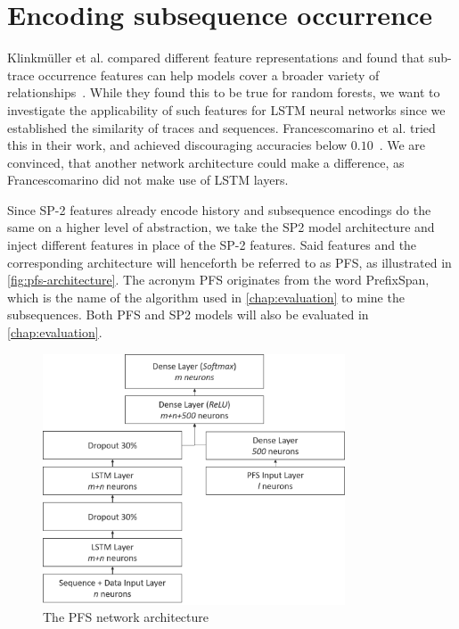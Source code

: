 \section{Encoding subsequence occurrence}
\label{sec:contrib:pfs-inspiration}
Klinkmüller et al. compared different feature representations and found that sub-trace occurrence features can help models cover a broader variety of relationships~\cite{klinkmuller2018reliablemonitoring}. While they found this to be true for random forests, we want to investigate the applicability of such features for LSTM neural networks since we established the similarity of traces and sequences. Francescomarino et al. tried this in their work, and achieved discouraging accuracies below $0.10$~\cite{francescomarino2017}. We are convinced, that another network architecture could make a difference, as Francescomarino did not make use of LSTM layers.

Since SP-2 features already encode history and subsequence encodings do the same on a higher level of abstraction, we take the SP2 model architecture and inject different features in place of the SP-2 features. Said features and the corresponding architecture will henceforth be referred to as PFS, as illustrated in \autoref{fig:pfs-architecture}. The acronym PFS originates from the word PrefixSpan, which is the name of the algorithm used in \autoref{chap:evaluation} to mine the subsequences. Both PFS and SP2 models will also be evaluated in \autoref{chap:evaluation}.

\begin{figure}[ht]
    \centering
    \includegraphics[width=0.8\textwidth]{gfx/pfs-network-architecture.png}
    \caption{The PFS network architecture}
    \label{fig:pfs-architecture}
\end{figure}
